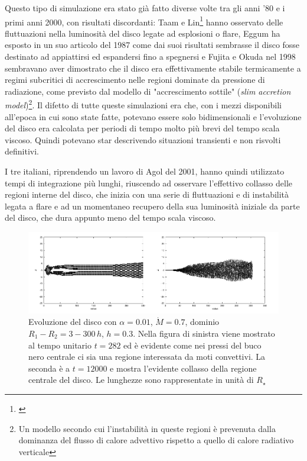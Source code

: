 \documentclass[a4paperbi]{article}
\begin{document}
	Questo tipo di simulazione era stato già fatto diverse volte tra gli anni '80 e i primi anni 2000, con risultati discordanti: Taam e Lin\footnote{\cite{TaamLin1984}} hanno osservato delle fluttuazioni nella luminosità del disco legate ad esplosioni o flare, Eggum ha esposto in un suo articolo del 1987 come dai suoi risultati sembrasse il disco fosse destinato ad appiattirsi ed espandersi fino a spegnersi e Fujita e Okuda nel 1998 sembravano aver dimostrato che il disco era effettivamente stabile termicamente a regimi subcritici di accrescimento nelle regioni dominate da pressione di radiazione, come previsto dal modello di "accrescimento sottile" (\textit{slim accretion model})\footnote{Un modello secondo cui l'instabilità in queste regioni è prevenuta dalla dominanza del flusso di calore advettivo rispetto a quello di calore radiativo verticale}. Il difetto di tutte queste simulazioni era che, con i mezzi disponibili all'epoca in cui sono state fatte, potevano essere solo bidimensionali e l'evoluzione del disco era calcolata per periodi di tempo molto più brevi del tempo scala viscoso. Quindi potevano star descrivendo situazioni transienti e non risvolti definitivi.
	
	I tre italiani, riprendendo un lavoro di Agol del 2001, hanno quindi utilizzato tempi di integrazione più lunghi, riuscendo ad osservare l'effettivo collasso delle regioni interne del disco, che inizia con una serie di fluttuazioni e di instabilità legata a flare e ad un momentaneo recupero della sua luminosità iniziale da parte del disco, che dura appunto meno del tempo scala viscoso. 

	\begin{figure}[H]
		\centering
		\includegraphics[width=1\linewidth]{CollassoDisco1}
		\caption{Evoluzione del disco con $\alpha=0.01$, $\dot{M}=0.7$, dominio $R_1-R_2=3-300\,h$, $h=0.3$. Nella figura di sinistra viene mostrato al tempo unitario $t=282$ ed è evidente come nei pressi del buco nero centrale ci sia una regione interessata da moti convettivi. La seconda è a $t=12000$ e mostra l'evidente collasso della regione centrale del disco. Le lunghezze sono rappresentate in unità di $R_\star$}
		\label{fig:CollassoDisco1}
	\end{figure}
\end{document}
